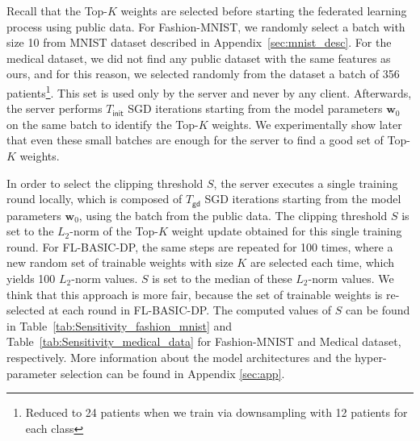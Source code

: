 \documentclass[accepted]{uai2021} %
\newcommand{\Tgd}{T_{\mathsf{gd}}}
\newcommand{\TOPK}{Top-$K$\xspace}
\begin{document}
Recall that the \TOPK weights are selected before starting the federated learning process using public data. For Fashion-MNIST, we randomly select  a batch with size 10 from MNIST dataset \citep{MNIST} described in Appendix~\ref{sec:mnist_desc}. For the medical dataset, we did not find any public dataset with the same features as ours, and for this reason, we selected randomly from the dataset a batch of 356 patients\footnote{Reduced to 24 patients when we train via downsampling with 12 patients for each class}. This set is used only by the server and never by any client. Afterwards, the server performs $T_{\mathsf{init}}$ SGD iterations starting from the model parameters $\mathbf{w}_0$ on the same batch to identify the \TOPK weights.
We experimentally show later that even these small batches are enough for the server to find a good set of \TOPK weights. 



In order to select the clipping threshold $S$, 
the server executes a single training round locally, which is composed of $\Tgd$ SGD iterations starting from the model parameters $\mathbf{w}_0$, using the batch from the public data. The clipping threshold $S$ is set to the $L_2$-norm of the \TOPK weight update obtained for this single training round. For FL-BASIC-DP, the same steps are repeated for 100 times, where a new random set of trainable weights with size $K$ are selected each time, which yields 100 $L_2$-norm values. $S$ is set to the median of these $L_2$-norm values. We think that this approach is more fair, because the set of trainable weights is re-selected at each round in FL-BASIC-DP. The computed values of $S$ can be found in Table~\ref{tab:Sensitivity_fashion_mnist} and Table~\ref{tab:Sensitivity_medical_data} for Fashion-MNIST and Medical dataset, respectively.  
More information about the model architectures and the hyper-parameter selection can be found in Appendix \ref{sec:app}. 

\end{document}
